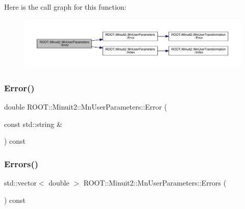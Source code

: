 Here is the call graph for this function\+:
\nopagebreak
\begin{figure}[H]
\begin{center}
\leavevmode
\includegraphics[width=350pt]{d6/d10/classROOT_1_1Minuit2_1_1MnUserParameters_a52dd385b551b309d26d0dc30581c0b56_cgraph}
\end{center}
\end{figure}
\mbox{\label{classROOT_1_1Minuit2_1_1MnUserParameters_a52dd385b551b309d26d0dc30581c0b56}} 
\subsubsection{\texorpdfstring{Error()}{Error()}\hspace{0.1cm}{\footnotesize\ttfamily [6/6]}}
{\footnotesize\ttfamily double R\+O\+O\+T\+::\+Minuit2\+::\+Mn\+User\+Parameters\+::\+Error (\begin{DoxyParamCaption}\item[{const std\+::string \&}]{ }\end{DoxyParamCaption}) const}

\mbox{\label{classROOT_1_1Minuit2_1_1MnUserParameters_a7cae98f6146725427e852655cee7a857}} 
\subsubsection{\texorpdfstring{Errors()}{Errors()}\hspace{0.1cm}{\footnotesize\ttfamily [1/3]}}
{\footnotesize\ttfamily std\+::vector$<$ double $>$ R\+O\+O\+T\+::\+Minuit2\+::\+Mn\+User\+Parameters\+::\+Errors (\begin{DoxyParamCaption}{ }\end{DoxyParamCaption}) const}

